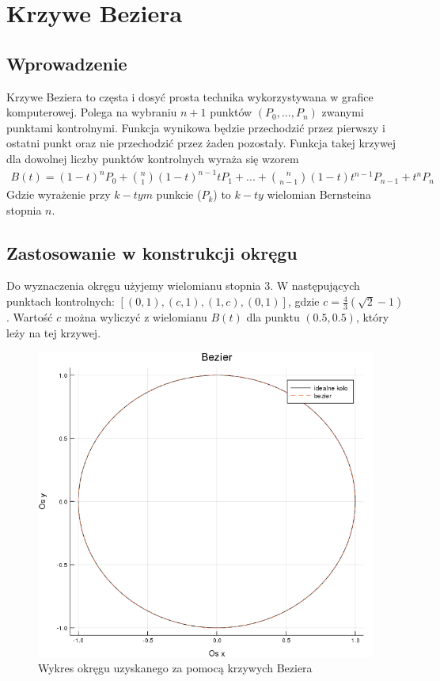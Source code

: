 \documentclass[paper=a4, fontsize=11pt]{scrartcl} %
\numberwithin{equation}{section} %
\numberwithin{figure}{section} %
\numberwithin{table}{section} %
\begin{document}
\section{Krzywe Beziera}
\subsection{Wprowadzenie}
Krzywe Beziera to częsta i dosyć prosta technika wykorzystywana w grafice komputerowej. Polega na wybraniu $n+1$ punktów $(P_{0}, ... , P_{n})$ zwanymi punktami kontrolnymi. Funkcja wynikowa będzie przechodzić przez pierwszy i ostatni punkt oraz nie przechodzić przez żaden pozostały. Funkcja takej krzywej dla dowolnej liczby punktów kontrolnych wyraża się wzorem 
\begin{align}
B(t) = (1-t)^{n}P_{0} + {{n}\choose{1}}(1-t)^{n-1}tP_{1} + ... + {{n}\choose{n-1}}(1-t)t^{n-1}P_{n-1} + t^{n}P_{n}
\end{align}
Gdzie wyrażenie przy $k-tym$ punkcie ($P_{k}$) to $k-ty$ wielomian Bernsteina stopnia $n$.

\subsection{Zastosowanie w konstrukcji okręgu}
Do wyznaczenia okręgu użyjemy wielomianu stopnia 3. W następujących punktach kontrolnych: $[(0,1), (c,1), (1,c), (0,1)]$, gdzie $c = \frac{4}{3}(\sqrt{2} - 1)$. Wartość $c$ można wyliczyć z wielomianu $B(t)$ dla punktu $(0.5, 0.5)$, który leży na tej krzywej.


\begin{figure}[h!]
\centering
 \includegraphics[width=0.68\linewidth]{bezier.png}
  \caption{Wykres okręgu uzyskanego za pomocą krzywych Beziera}
  \label{bezier}
\end{figure}
\FloatBarrier
\end{document}
